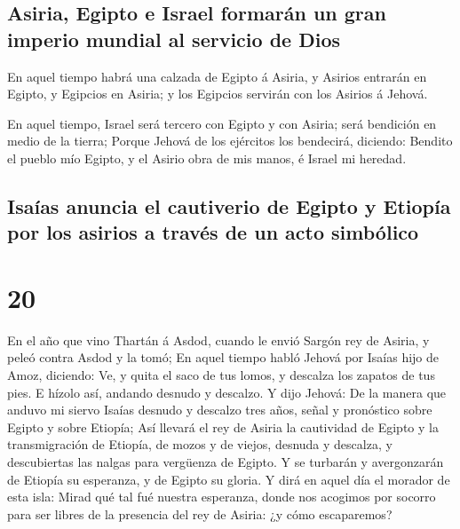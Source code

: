 \hypertarget{asiria-egipto-e-israel-formaruxe1n-un-gran-imperio-mundial-al-servicio-de-dios}{%
\subsection{Asiria, Egipto e Israel formarán un gran imperio mundial al
servicio de
Dios}\label{asiria-egipto-e-israel-formaruxe1n-un-gran-imperio-mundial-al-servicio-de-dios}}

 En aquel tiempo habrá una calzada de Egipto á Asiria, y
Asirios entrarán en Egipto, y Egipcios en Asiria; y los Egipcios
servirán con los Asirios á Jehová.

 En aquel tiempo, Israel será tercero con Egipto y con
Asiria; será bendición en medio de la tierra;  Porque
Jehová de los ejércitos los bendecirá, diciendo: Bendito el pueblo mío
Egipto, y el Asirio obra de mis manos, é Israel mi heredad.

\hypertarget{isauxedas-anuncia-el-cautiverio-de-egipto-y-etiopuxeda-por-los-asirios-a-travuxe9s-de-un-acto-simbuxf3lico}{%
\subsection{Isaías anuncia el cautiverio de Egipto y Etiopía por los
asirios a través de un acto
simbólico}\label{isauxedas-anuncia-el-cautiverio-de-egipto-y-etiopuxeda-por-los-asirios-a-travuxe9s-de-un-acto-simbuxf3lico}}

\hypertarget{section-19}{%
\section{20}\label{section-19}}

 En el año que vino Thartán á Asdod, cuando le envió
Sargón rey de Asiria, y peleó contra Asdod y la tomó;  En
aquel tiempo habló Jehová por Isaías hijo de Amoz, diciendo: Ve, y quita
el saco de tus lomos, y descalza los zapatos de tus pies. E hízolo así,
andando desnudo y descalzo.  Y dijo Jehová: De la manera
que anduvo mi siervo Isaías desnudo y descalzo tres años, señal y
pronóstico sobre Egipto y sobre Etiopía;  Así llevará el
rey de Asiria la cautividad de Egipto y la transmigración de Etiopía, de
mozos y de viejos, desnuda y descalza, y descubiertas las nalgas para
vergüenza de Egipto.  Y se turbarán y avergonzarán de
Etiopía su esperanza, y de Egipto su gloria.  Y dirá en
aquel día el morador de esta isla: Mirad qué tal fué nuestra esperanza,
donde nos acogimos por socorro para ser libres de la presencia del rey
de Asiria: ¿y cómo escaparemos?

